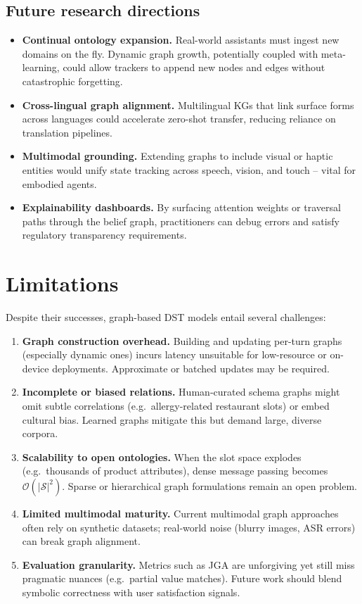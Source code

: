 \documentclass[11pt]{article}
\begin{document}
\subsection{Future research directions}
\begin{itemize}
  \item \textbf{Continual ontology expansion.}  Real-world assistants must ingest new domains on the fly.  Dynamic graph growth, potentially coupled with meta-learning, could allow trackers to append new nodes and edges without catastrophic forgetting.
  \item \textbf{Cross-lingual graph alignment.}  Multilingual KGs that link surface forms across languages could accelerate zero-shot transfer, reducing reliance on translation pipelines.
  \item \textbf{Multimodal grounding.}  Extending graphs to include visual or haptic entities would unify state tracking across speech, vision, and touch – vital for embodied agents.
  \item \textbf{Explainability dashboards.}  By surfacing attention weights or traversal paths through the belief graph, practitioners can debug errors and satisfy regulatory transparency requirements.
\end{itemize}

\section{Limitations}
Despite their successes, graph-based DST models entail several challenges:

\begin{enumerate}
  \item \textbf{Graph construction overhead.}  Building and updating per-turn graphs (especially dynamic ones) incurs latency unsuitable for low-resource or on-device deployments.  Approximate or batched updates may be required.
  \item \textbf{Incomplete or biased relations.}  Human‐curated schema graphs might omit subtle correlations (e.g.\ allergy-related restaurant slots) or embed cultural bias.  Learned graphs mitigate this but demand large, diverse corpora.
  \item \textbf{Scalability to open ontologies.}  When the slot space explodes (e.g.\ thousands of product attributes), dense message passing becomes \(\mathcal{O}(|\mathcal{S}|^2)\).  Sparse or hierarchical graph formulations remain an open problem.
  \item \textbf{Limited multimodal maturity.}  Current multimodal graph approaches often rely on synthetic datasets; real‐world noise (blurry images, ASR errors) can break graph alignment.
  \item \textbf{Evaluation granularity.}  Metrics such as JGA are unforgiving yet still miss pragmatic nuances (e.g.\ partial value matches).  Future work should blend symbolic correctness with user satisfaction signals.
\end{enumerate}
\end{document}

